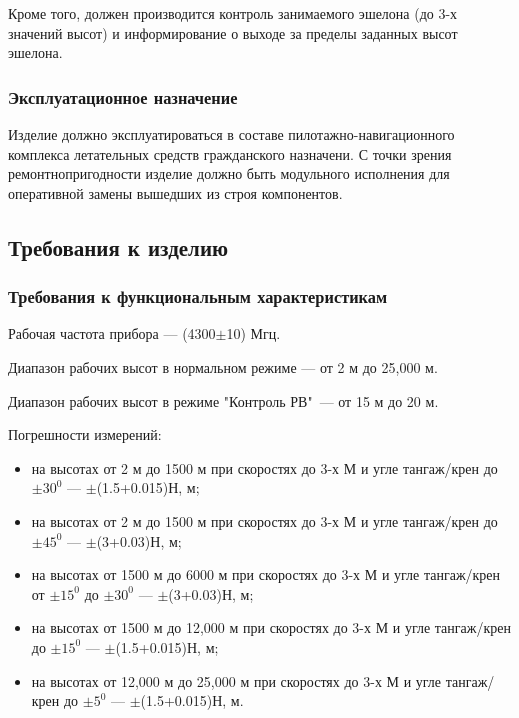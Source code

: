 \documentclass[utf8x, 14pt, oneside, a4paper]{article}
\begin{document}
			Кроме того, должен производится контроль занимаемого эшелона (до 3-х значений высот) и информирование о выходе за пределы заданных высот эшелона.
			
			\subsubsection*{Эксплуатационное назначение}
			Изделие должно эксплуатироваться в составе пилотажно-навигационного комплекса летательных средств гражданского назначени. С точки зрения ремонтнопригодности изделие должно быть модульного исполнения для оперативной замены вышедших из строя компонентов.
		
		\subsection*{Требования к изделию}
			\subsubsection*{Требования к функциональным характеристикам}
			Рабочая частота прибора --- (4300$\pm$10) Мгц.
			
			\vspace{\baselineskip}
			Диапазон рабочих высот в нормальном режиме --- от 2 м до 25,000 м.
			
			\vspace{\baselineskip}
			Диапазон рабочих высот в режиме "Контроль РВ"\ --- от 15 м до 20 м.
			
			\vspace{\baselineskip}
			Погрешности измерений:
			\begin{itemize}
				\item на высотах от 2 м до 1500 м при скоростях до 3-х М и угле тангаж/крен до $\pm30^{0}$ --- $\pm$(1.5+0.015)Н, м;
				\item на высотах от 2 м до 1500 м при скоростях до 3-х М и угле тангаж/крен до $\pm45^{0}$ --- $\pm$(3+0.03)Н, м;
				\item на высотах от 1500 м до 6000 м при скоростях до 3-х М и угле тангаж/крен от $\pm15^{0}$ до $\pm30^{0}$ --- $\pm$(3+0.03)Н, м;
				\item на высотах от 1500 м до 12,000 м при скоростях до 3-х М и угле тангаж/крен до $\pm15^{0}$ --- $\pm$(1.5+0.015)Н, м;
				\item на высотах от 12,000 м до 25,000 м при скоростях до 3-х М и угле тангаж/крен до $\pm5^{0}$ --- $\pm$(1.5+0.015)Н, м.
			\end{itemize}
			
\end{document}
